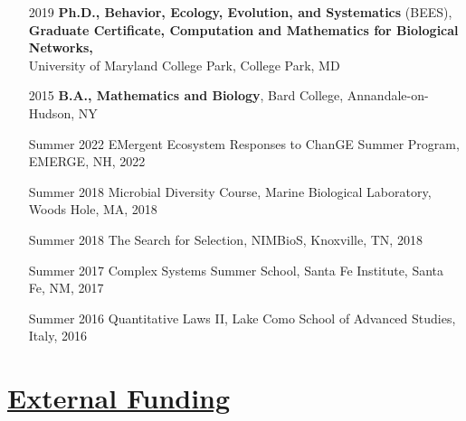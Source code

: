 \documentclass[]{res}
\begin{document}
\begin{resume}
\begin{enumerate}
\setlength\itemsep{0.2em}
\item[2019] {\bf Ph.D., Behavior, Ecology, Evolution, and Systematics} (BEES),\\
{\bf Graduate Certificate, Computation and Mathematics for Biological Networks,}\\
University of Maryland College Park, College Park, MD
\item[2015]  {\bf B.A., Mathematics and Biology}, Bard College, Annandale-on-Hudson, NY
\item[Summer 2022] {EMergent Ecosystem Responses to ChanGE Summer Program}, EMERGE, NH, 2022
\item[Summer 2018] {Microbial Diversity Course}, Marine Biological Laboratory, Woods Hole, MA, 2018
\item[Summer 2018] {The Search for Selection}, NIMBioS, Knoxville, TN, 2018
\item[Summer 2017] {Complex Systems Summer School}, Santa Fe Institute, Santa Fe, NM, 2017
\item[Summer 2016] {Quantitative Laws II}, Lake Como School of Advanced Studies, Italy, 2016  
\end{enumerate}

\section{\underline{External Funding}} %


\end{resume}
\end{document}
